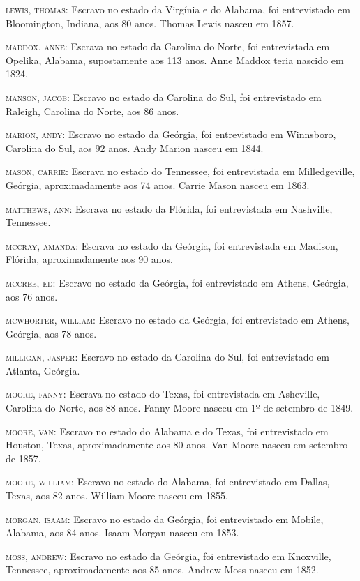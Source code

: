 \begin{Parskip}
\textsc{lewis, thomas:} Escravo no estado da Virgínia e do Alabama, foi
entrevistado em Bloomington, Indiana, aos 80 anos. Thomas Lewis nasceu
em 1857.

\textsc{maddox, anne:} Escrava no estado da Carolina do Norte, foi
entrevistada em Opelika, Alabama, supostamente aos 113 anos. Anne Maddox
teria nascido em 1824.

\textsc{manson, jacob:} Escravo no estado da Carolina do Sul, foi
entrevistado em Raleigh, Carolina do Norte, aos 86 anos.

\textsc{marion, andy:} Escravo no estado da Geórgia, foi entrevistado em
Winnsboro, Carolina do Sul, aos 92 anos. Andy Marion nasceu em 1844.

\textsc{mason, carrie:} Escrava no estado do Tennessee, foi entrevistada
em Milledgeville, Geórgia, aproximadamente aos 74 anos. Carrie Mason
nasceu em 1863.

\textsc{matthews, ann:} Escrava no estado da Flórida, foi entrevistada
em Nashville, Tennessee.

\textsc{mccray, amanda:} Escrava no estado da Geórgia, foi entrevistada
em Madison, Flórida, aproximadamente aos 90 anos.

\textsc{mccree, ed:} Escravo no estado da Geórgia, foi entrevistado em
Athens, Geórgia, aos 76 anos.

\textsc{mcwhorter, william:} Escravo no estado da Geórgia, foi
entrevistado em Athens, Geórgia, aos 78 anos.

\textsc{milligan, jasper:} Escravo no estado da Carolina do Sul, foi
entrevistado em Atlanta, Geórgia.

\textsc{moore, fanny:} Escrava no estado do Texas, foi entrevistada em
Asheville, Carolina do Norte, aos 88 anos. Fanny Moore nasceu em 1º de
setembro de 1849.

\textsc{moore, van:} Escravo no estado do Alabama e do Texas, foi
entrevistado em Houston, Texas, aproximadamente aos 80 anos. Van Moore
nasceu em setembro de 1857.

\textsc{moore, william:} Escravo no estado do Alabama, foi entrevistado
em Dallas, Texas, aos 82 anos. William Moore nasceu em 1855.

\textsc{morgan, isaam:} Escravo no estado da Geórgia, foi entrevistado
em Mobile, Alabama, aos 84 anos. Isaam Morgan nasceu em 1853.

\textsc{moss, andrew:} Escravo no estado da Geórgia, foi entrevistado em
Knoxville, Tennessee, aproximadamente aos 85 anos. Andrew Moss nasceu em
1852.


\end{Parskip}
